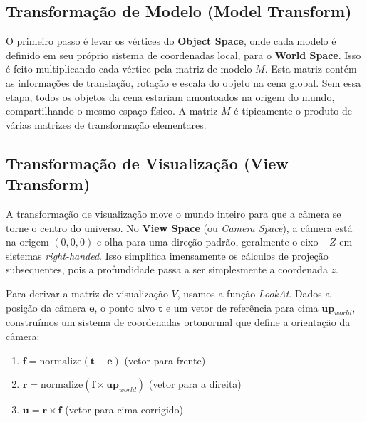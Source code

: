 \subsection{Transformação de Modelo (Model Transform)}

O primeiro passo é levar os vértices do \textbf{Object Space}, onde cada modelo é definido em seu próprio sistema de coordenadas local, para o \textbf{World Space}. Isso é feito multiplicando cada vértice pela matriz de modelo $M$. Esta matriz contém as informações de translação, rotação e escala do objeto na cena global. Sem essa etapa, todos os objetos da cena estariam amontoados na origem do mundo, compartilhando o mesmo espaço físico. A matriz $M$ é tipicamente o produto de várias matrizes de transformação elementares.

\subsection{Transformação de Visualização (View Transform)}

A transformação de visualização move o mundo inteiro para que a câmera se torne o centro do universo. No \textbf{View Space} (ou \textit{Camera Space}), a câmera está na origem $(0,0,0)$ e olha para uma direção padrão, geralmente o eixo $-Z$ em sistemas \textit{right-handed}. Isso simplifica imensamente os cálculos de projeção subsequentes, pois a profundidade passa a ser simplesmente a coordenada $z$.

Para derivar a matriz de visualização $V$, usamos a função \textit{LookAt}. Dados a posição da câmera $\mathbf{e}$, o ponto alvo $\mathbf{t}$ e um vetor de referência para cima $\mathbf{up}_{world}$, construímos um sistema de coordenadas ortonormal que define a orientação da câmera:

\begin{enumerate}
    \item $\mathbf{f} = \text{normalize}(\mathbf{t} - \mathbf{e})$ (vetor para frente)
    \item $\mathbf{r} = \text{normalize}(\mathbf{f} \times \mathbf{up}_{world})$ (vetor para a direita)
    \item $\mathbf{u} = \mathbf{r} \times \mathbf{f}$ (vetor para cima corrigido)
\end{enumerate}

